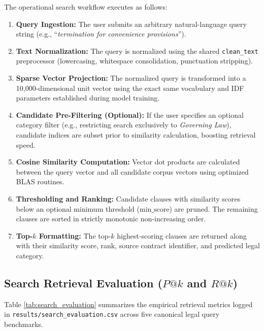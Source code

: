 The operational search workflow executes as follows:
\begin{enumerate}
    \item \textbf{Query Ingestion:} The user submits an arbitrary natural-language query string (e.g., ``\textit{termination for convenience provisions}'').
    \item \textbf{Text Normalization:} The query is normalized using the shared \texttt{clean\_text} preprocessor (lowercasing, whitespace consolidation, punctuation stripping).
    \item \textbf{Sparse Vector Projection:} The normalized query is transformed into a 10,000-dimensional unit vector using the exact same vocabulary and IDF parameters established during model training.
    \item \textbf{Candidate Pre-Filtering (Optional):} If the user specifies an optional category filter (e.g., restricting search exclusively to \textit{Governing Law}), candidate indices are subset prior to similarity calculation, boosting retrieval speed.
    \item \textbf{Cosine Similarity Computation:} Vector dot products are calculated between the query vector and all candidate corpus vectors using optimized BLAS routines.
    \item \textbf{Thresholding and Ranking:} Candidate clauses with similarity scores below an optional minimum threshold ($\text{min\_score}$) are pruned. The remaining clauses are sorted in strictly monotonic non-increasing order.
    \item \textbf{Top-$k$ Formatting:} The top-$k$ highest-scoring clauses are returned along with their similarity score, rank, source contract identifier, and predicted legal category.
\end{enumerate}

\subsection{Search Retrieval Evaluation ($P@k$ and $R@k$)}
Table \ref{tab:search_evaluation} summarizes the empirical retrieval metrics logged in \texttt{results/search\_evaluation.csv} across five canonical legal query benchmarks.


